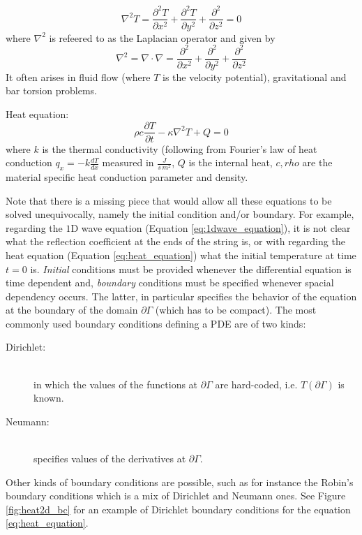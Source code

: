 \begin{description}
\begin{descritpion}
     	\begin{equation}
     	\nabla^2T = \frac{\partial^2 T}{\partial x^2} + \frac{\partial^2 T}{\partial y^2}+ \frac{\partial^2}{\partial z^2}=0
     	\end{equation}
     	where $\nabla^2$ is refeered to as the Laplacian operator and given by $$\nabla^2=\nabla \cdot \nabla = \frac{\partial^2}{\partial x^2} + \frac{\partial^2}{\partial y^2} + \frac{\partial^2}{\partial z^2}$$ It often arises in fluid flow (where $T$ is the velocity potential), gravitational and bar torsion problems.
     \item [Heat equation:]\hfil \\  
     	\begin{equation}
     	 \rho c\frac{\partial T}{\partial t} - \kappa \nabla^2T +Q=0
     	\label{eq:heat_equation}
     	\end{equation}
     	where $k$ is the thermal conductivity (following from Fourier's law of heat conduction $q_x=-k\frac{dT}{dx}$ measured in $\frac{J}{s\, m^2}$, $Q$ is the internal heat, $c,rho$ are the material specific heat conduction parameter and density.
   \end{descritpion}
\end{description}

Note that there is a missing piece that would allow all these equations to be solved unequivocally, namely the initial condition and/or boundary. For example, regarding the $1$D wave equation (Equation \ref{eq:1dwave_equation}), it is not clear what the reflection coefficient at the ends of the string is, or with  regarding the heat equation (Equation \ref{eq:heat_equation}) what  the initial temperature at time $t=0$ is. 
\textit{Initial} conditions must be provided whenever the differential equation is time dependent and, \textit{boundary} conditions must be specified whenever spacial dependency occurs. The latter, in particular specifies the behavior of the equation at the boundary of the domain $\partial \Gamma$ (which has to be compact). The most commonly used boundary conditions defining a PDE are of two kinds:
\begin{description}
	\item [Dirichlet:] \hfil \\ in which the values of the functions at $\partial \Gamma$ are hard-coded, i.e. $T(\partial \Gamma)$  is known.
	
	\item [Neumann:] \hfil \\ specifies values of the derivatives at $\partial \Gamma$.
	
\end{description} 
Other kinds of boundary conditions are possible, such as for instance the Robin's boundary conditions\cite{Estep:1996:CDE:548037} which is a mix of Dirichlet and Neumann ones. See Figure \ref{fig:heat2d_bc} for an example of Dirichlet boundary conditions for the equation \ref{eq:heat_equation}.

